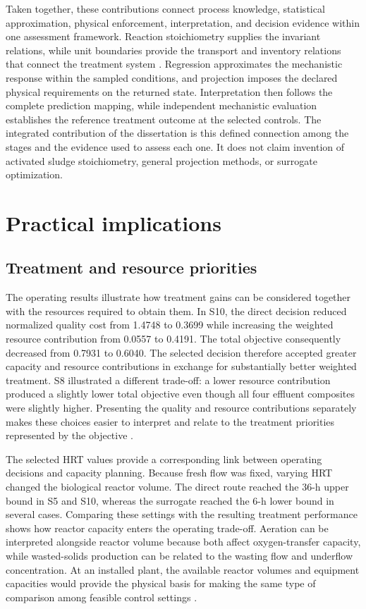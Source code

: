 Taken together, these contributions connect process knowledge, statistical approximation, physical enforcement, interpretation, and decision evidence within one assessment framework. Reaction stoichiometry supplies the invariant relations, while unit boundaries provide the transport and inventory relations that connect the treatment system \citep{Henze2006,Alex2008}. Regression approximates the mechanistic response within the sampled conditions, and projection imposes the declared physical requirements on the returned state. Interpretation then follows the complete prediction mapping, while independent mechanistic evaluation establishes the reference treatment outcome at the selected controls. The integrated contribution of the dissertation is this defined connection among the stages and the evidence used to assess each one. It does not claim invention of activated sludge stoichiometry, general projection methods, or surrogate optimization.

\section{Practical implications}
\label{sec:assessment_practical_implications}

\subsection{Treatment and resource priorities}

The operating results illustrate how treatment gains can be considered together with the resources required to obtain them. In S10, the direct decision reduced normalized quality cost from 1.4748 to 0.3699 while increasing the weighted resource contribution from 0.0557 to 0.4191. The total objective consequently decreased from 0.7931 to 0.6040. The selected decision therefore accepted greater capacity and resource contributions in exchange for substantially better weighted treatment. S8 illustrated a different trade-off: a lower resource contribution produced a slightly lower total objective even though all four effluent composites were slightly higher. Presenting the quality and resource contributions separately makes these choices easier to interpret and relate to the treatment priorities represented by the objective \citep{PadronPaez2020,Aboagye2021}.

The selected HRT values provide a corresponding link between operating decisions and capacity planning. Because fresh flow was fixed, varying HRT changed the biological reactor volume. The direct route reached the 36-h upper bound in S5 and S10, whereas the surrogate reached the 6-h lower bound in several cases. Comparing these settings with the resulting treatment performance shows how reactor capacity enters the operating trade-off. Aeration can be interpreted alongside reactor volume because both affect oxygen-transfer capacity, while wasted-solids production can be related to the wasting flow and underflow concentration. At an installed plant, the available reactor volumes and equipment capacities would provide the physical basis for making the same type of comparison among feasible control settings \citep{Henze2008,Miederer2025}.

